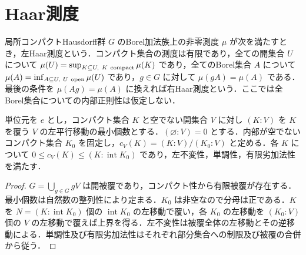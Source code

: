 \section{Haar測度}
\begin{defn}[左Haar測度と右Haar測度]
局所コンパクトHausdorff群 $G$ のBorel加法族上の非零測度 $\mu$ が次を満たすとき，左Haar測度という．コンパクト集合の測度は有限であり，全ての開集合 $U$ について $\mu(U)=\sup_{K\subseteq U,\ K\ {\rm compact}}\mu(K)$ であり，全てのBorel集合 $A$ について $\mu(A)=\inf_{A\subseteq U,\ U\ {\rm open}}\mu(U)$ であり，$g\in G$ に対して $\mu(gA)=\mu(A)$ である．最後の条件を $\mu(Ag)=\mu(A)$ に換えれば右Haar測度という．ここでは全Borel集合についての内部正則性は仮定しない．
\end{defn}
\begin{prop}[有限被覆数とその正規化]
単位元を $e$ とし，コンパクト集合 $K$ と空でない開集合 $V$ に対し $(K:V)$ を $K$ を覆う $V$ の左平行移動の最小個数とする．$(\varnothing:V)=0$ とする．内部が空でないコンパクト集合 $K_0$ を固定し，$c_V(K)=(K:V)/(K_0:V)$ と定める．各 $K$ について $0\leq c_V(K)\leq(K:\operatorname{int}K_0)$ であり，左不変性，単調性，有限劣加法性を満たす．
\end{prop}
\begin{proof}
$G=\bigcup_{g\in G}gV$ は開被覆であり，コンパクト性から有限被覆が存在する．最小個数は自然数の整列性により定まる．$K_0$ は非空なので分母は正である．$K$ を $N=(K:\operatorname{int}K_0)$ 個の $\operatorname{int}K_0$ の左移動で覆い，各 $K_0$ の左移動を $(K_0:V)$ 個の $V$ の左移動で覆えば上界を得る．左不変性は被覆全体の左移動とその逆移動による．単調性及び有限劣加法性はそれぞれ部分集合への制限及び被覆の合併から従う．
\end{proof}
